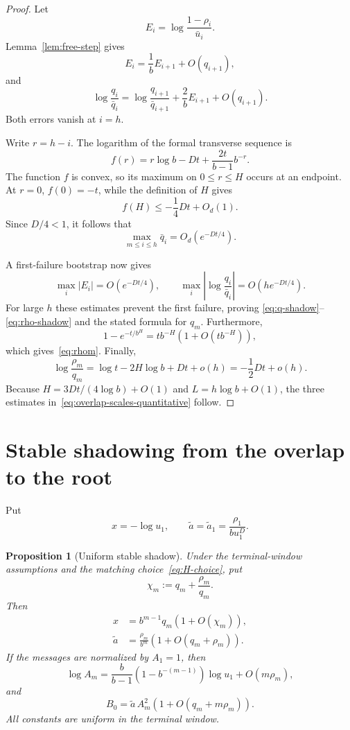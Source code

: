 \documentclass[11pt]{amsart}
\newtheorem{proposition}[theorem]{Proposition}
\theoremstyle{definition}
\begin{document}
\begin{proof}
Let
\[
 E_i=\log\frac{1-\rho_i}{\bar u_i}.
\]
Lemma~\ref{lem:free-step} gives
\[
 E_i=\frac1bE_{i+1}+O(q_{i+1}),
\]
and
\[
 \log\frac{q_i}{\bar q_i}
 =\log\frac{q_{i+1}}{\bar q_{i+1}}
 +\frac2bE_{i+1}+O(q_{i+1}).
\]
Both errors vanish at $i=h$.

Write $r=h-i$.  The logarithm of the formal transverse sequence is
\[
 f(r)=r\log b-Dt+\frac{2t}{b-1}b^{-r}.
\]
The function $f$ is convex, so its maximum on $0\le r\le H$ occurs at an endpoint.  At $r=0$, $f(0)=-t$, while the definition of $H$ gives
\[
 f(H)\le-\frac14Dt+O_d(1).
\]
Since $D/4<1$, it follows that
\[
 \max_{m\le i\le h}\bar q_i=O_d(e^{-Dt/4}).
\]

A first-failure bootstrap now gives
\[
 \max_i|E_i|=O(e^{-Dt/4}),
 \qquad
 \max_i\left|\log\frac{q_i}{\bar q_i}\right|
 =O(h e^{-Dt/4}).
\]
For large $h$ these estimates prevent the first failure, proving
\eqref{eq:q-shadow}--\eqref{eq:rho-shadow} and the stated formula for $q_m$.
Furthermore,
\[
 1-e^{-t/b^H}=t b^{-H}\left(1+O(t b^{-H})\right),
\]
which gives~\eqref{eq:rhom}.  Finally,
\[
 \log\frac{\rho_m}{q_m}
 =\log t-2H\log b+Dt+o(h)
 =-\frac12Dt+o(h).
\]
Because $H=3Dt/(4\log b)+O(1)$ and $L=h\log b+O(1)$, the three estimates in~\eqref{eq:overlap-scales-quantitative} follow.
\end{proof}


\section{Stable shadowing from the overlap to the root}
Put
\[
 x=-\log u_1,
 \qquad
 \widetilde a=\widetilde a_1
 =\frac{\rho_1}{b u_1^D}.
\]

\begin{proposition}[Uniform stable shadow]\label{prop:stable-shadow}
Under the terminal-window assumptions and the matching choice~\eqref{eq:H-choice}, put
\[
 \chi_m:=q_m+\frac{\rho_m}{q_m}.
\]
Then
\begin{align}
 x&=b^{m-1}q_m\left(1+O(\chi_m)\right),\label{eq:x-from-q}\\
 \widetilde a&=\frac{\rho_m}{b^m}
 \left(1+O(q_m+\rho_m)\right).\label{eq:atilde-from-rho}
\end{align}
If the messages are normalized by $A_1=1$, then
\begin{equation}\label{eq:Am-stable}
 \log A_m
 =\frac{b}{b-1}\left(1-b^{-(m-1)}\right)\log u_1
 +O(m\rho_m),
\end{equation}
and
\begin{equation}\label{eq:r-Am}
 B_0=\widetilde a\,A_m^2
 \left(1+O(q_m+m\rho_m)\right).
\end{equation}
All constants are uniform in the terminal window.
\end{proposition}
\end{document}
